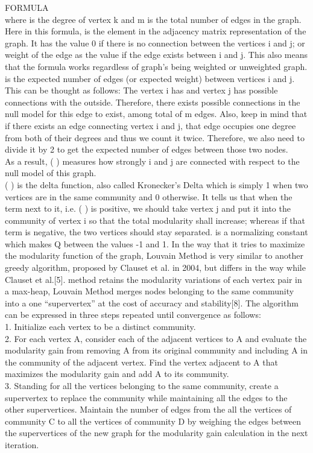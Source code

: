 \documentclass[10pt]{article}
\begin{document}
FORMULA \\

where is the degree of vertex k and m is the total number of edges in the graph. Here in this formula, is the element in the adjacency matrix representation of the graph. It has the value 0 if there is no connection between the vertices i and j; or weight of the edge as the value if the edge exists between i and j. This also means that the formula works regardless of graph’s being weighted or unweighted graph. \\
is the expected number of edges (or expected weight) between vertices i and j. This can be thought as follows: The vertex i has and vertex j has possible connections with the outside. Therefore, there exists possible connections in the null model for this edge to exist, among total of m edges. Also, keep in mind that if there exists an edge connecting vertex i and j, that edge occupies one degree from both of their degrees and thus we count it twice. Therefore, we also need to divide it by 2 to get the expected number of edges between those two nodes. \\

As a result, ( ) measures how strongly i and j are connected with respect to the null model of this graph. \\

( ) is the delta function, also called Kronecker’s Delta which is simply 1 when two vertices are
in the same community and 0 otherwise. It tells us that when the term next to it, i.e. ( ) is
positive, we should take vertex j and put it into the community of vertex i so that the total modularity shall increase; whereas if that term is negative, the two vertices should stay separated.
is a normalizing constant which makes Q between the values -1 and 1.
In the way that it tries to maximize the modularity function of the graph, Louvain Method is very similar to another greedy algorithm, proposed by Clauset et al. in 2004, but differs in the way while Clauset et al.[5]. method retains the modularity variations of each vertex pair in a max-heap, Louvain Method merges nodes belonging to the same community into a one “supervertex” at the cost of accuracy and stability[8].
The algorithm can be expressed in three steps repeated until convergence as follows: \\ 
      
1. Initialize each vertex to be a distinct community. \\
2. For each vertex A, consider each of the adjacent vertices to A and evaluate the modularity gain from removing A from its original community and including A in the community of the adjacent vertex. Find the vertex adjacent to A that maximizes the modularity gain and add A to its community. \\
3. Standing for all the vertices belonging to the same community, create a supervertex to replace the community while maintaining all the edges to the other supervertices. Maintain the number of edges from the all the vertices of community C to all the vertices of community D by weighing the edges between the supervertices of the new graph for the modularity gain calculation in the next iteration. \\
\end{document}
